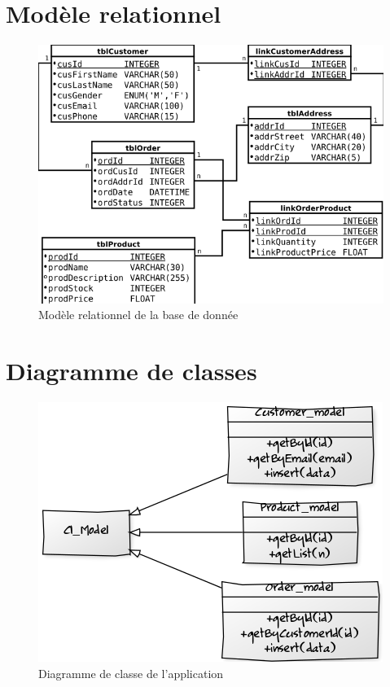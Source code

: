 \documentclass[12pt]{article}
\begin{document}
\section{Modèle relationnel}

\begin{figure}[ht]
    \center
    \includegraphics[scale=0.7]{../Diagrams/ClassDiagrams/Database.png}
    \caption*{Modèle relationnel de la base de donnée}
\end{figure}

\section{Diagramme de classes}

\begin{figure}[ht]
    \center
    \includegraphics[scale=0.7]{../Diagrams/ClassDiagrams/Models.png}
    \caption*{Diagramme de classe de l'application}
\end{figure}
\end{document}
